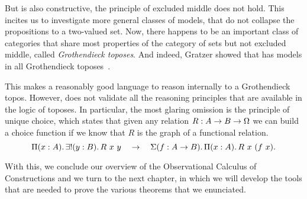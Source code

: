 But \SetoidCC is also constructive, \ie the principle of excluded middle
does not hold. 
% 
This incites us to investigate more general classes of models, that do not 
collapse the propositions to a two-valued set. 
% 
Now, there happens to be an important class of categories that share most
properties of the category of sets but not excluded middle, called 
\emph{Grothendieck toposes}. 
% 
And indeed, Gratzer showed that \SetoidCC has models in all Grothendieck 
toposes~.

This makes \SetoidCC a reasonably good language to reason internally to a 
Grothendieck topos. 
However, \SetoidCC does not validate all the reasoning principles that are
available in the logic of toposes. In particular, the most glaring omission is the
principle of unique choice, which states that given any relation 
\( R : A \to B \to \sProp \) we can build a choice function if we know that \( R \)
is the graph of a functional relation.
% 
\[
	\Depfun{A}{\ExistsUnique[y]{B}{R\ x\ y}} \quad \to \quad \Depsum[f]{\Fun{A}{B}}{\Depfun{A}{R\ x\ (f\ x)}}.
\]

With this, we conclude our overview of the Observational Calculus of 
Constructions and we turn to the next chapter, in which we will develop the
tools that are needed to prove the various theorems that we enunciated.



